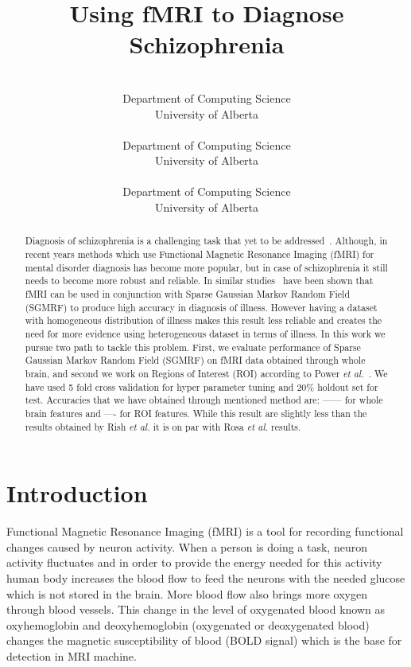 \documentclass{article} %
\title{Using fMRI to Diagnose Schizophrenia}
\author{%
	\\
	Department of Computing Science\\
	University of Alberta\\
	\texttt{} 
\And 
 \\
Department of Computing Science\\
University of Alberta\\
\texttt{}
\And 
\\
Department of Computing Science\\
University of Alberta\\
\texttt{}  
}
\begin{document}
	\maketitle

\begin{abstract}
Diagnosis of schizophrenia is a challenging task that yet to be 
addressed~\cite{McGuire200891}. Although, in recent years methods which use 
Functional Magnetic Resonance Imaging (fMRI) for mental disorder diagnosis has 
become more popular, but in case of schizophrenia it still needs to become 
more robust and reliable. In similar studies~\cite{Rish_2013}\cite{Rosa_2013} 
have been shown that fMRI can be used in conjunction with Sparse Gaussian 
Markov Random Field (SGMRF) to produce high accuracy in diagnosis of illness. 
However having a dataset with homogeneous distribution of illness makes this 
result less reliable and creates the need for more evidence using 
heterogeneous dataset in terms of illness. In this work we pursue two path to 
tackle this problem. First, we evaluate performance of Sparse Gaussian Markov 
Random Field (SGMRF) on fMRI data obtained through whole brain, and second we 
work on Regions of Interest (ROI) according to Power \emph{et al.}~\cite{Power_2011}. 
We have used 5 fold cross validation for hyper parameter tuning and $20\%$ 
holdout set for test. Accuracies that we have obtained through mentioned 
method are: ------ for whole brain features and ---- for ROI features. While 
this result are slightly less than the results obtained by Rish \emph{et al.} 
it is on par with Rosa \emph{et al.} results.  
\end{abstract}


\section{Introduction}
Functional Magnetic Resonance Imaging (fMRI) is a tool for recording 
functional changes caused by neuron activity. When a person is doing a task, 
neuron activity fluctuates and  in order to provide the energy 
needed for this activity human body increases the blood flow to feed the neurons with 
the needed glucose which is not stored in the brain. More blood flow also 
brings more oxygen through blood vessels. This change in the level of 
oxygenated blood known as oxyhemoglobin and deoxyhemoglobin (oxygenated or 
deoxygenated blood) changes the magnetic susceptibility of blood (BOLD signal) 
which is the base for detection in MRI machine. \\
\end{document}
